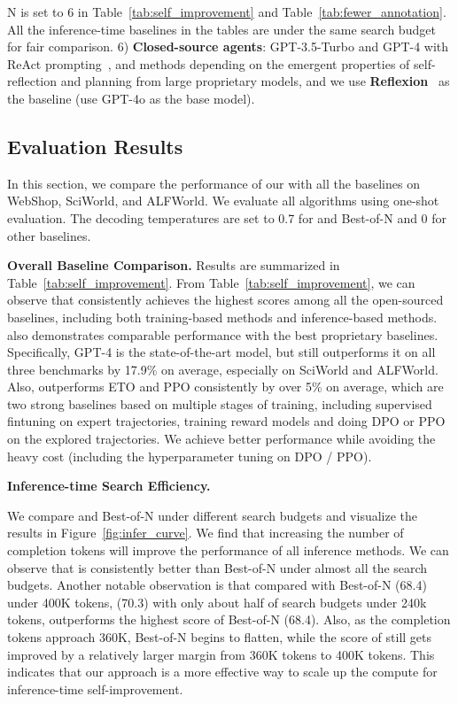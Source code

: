 N is set to 6 in Table~\ref{tab:self_improvement} and Table~\ref{tab:fewer_annotation}.
All the inference-time baselines in the tables are under the same search budget for fair comparison.
6) \textbf{Closed-source agents}: GPT-3.5-Turbo and GPT-4 with ReAct prompting~\citep{yao2023react}, and methods depending on the emergent properties of self-reflection and planning from large proprietary models, and we use \textbf{Reflexion}~\citep{shinn2023reflexion} as the baseline (use GPT-4o as the base model).

\subsection{Evaluation Results}
In this section, we compare the performance of our {\ours} with all the baselines on WebShop, SciWorld, and ALFWorld. We evaluate all algorithms using one-shot evaluation. The decoding temperatures are set to 0.7 for {\ours} and Best-of-N and 0 for other baselines.

\noindent \textbf{Overall Baseline Comparison.} Results are summarized in Table~\ref{tab:self_improvement}. From Table~\ref{tab:self_improvement}, we can observe that {\ours} consistently achieves the highest scores among all the open-sourced baselines, including both training-based methods and inference-based methods. {\ours} also demonstrates comparable performance with the best proprietary baselines. Specifically, GPT-4 is the state-of-the-art model, but {\ours} still outperforms it on all three benchmarks by 17.9\% on average, especially on SciWorld and ALFWorld. Also, {\ours} outperforms ETO and PPO consistently by over 5\% on average, which are two strong baselines based on multiple stages of training, including supervised fintuning on expert trajectories, training reward models and doing DPO or PPO on the explored trajectories. We achieve better performance while avoiding the heavy cost (including the hyperparameter tuning on DPO / PPO).


\noindent \textbf{Inference-time Search Efficiency.}

We compare {\ours} and Best-of-N under different search budgets and visualize the results in Figure~\ref{fig:infer_curve}.
We find that increasing the number of completion tokens will improve the performance of all inference methods. We can observe that {\ours} is consistently better than Best-of-N under almost all the search budgets.  
Another notable observation is that compared with Best-of-N (68.4) under 400K tokens, {\ours} (70.3) with only about half of search budgets under 240k tokens, outperforms the highest score of Best-of-N (68.4).
Also, as the completion tokens approach 360K, Best-of-N begins to flatten, while the score of {\ours} still gets improved by a relatively larger margin from 360K tokens to 400K tokens. This indicates that our approach is a more effective way to scale up the compute for inference-time self-improvement.


